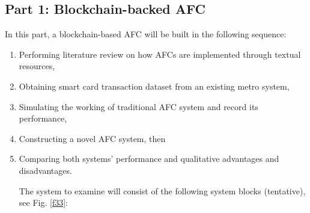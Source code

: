\documentclass[a4paper,12pt,oneside, utf8x]{report}
\begin{document}
\subsection{Part 1: Blockchain-backed AFC}
In this part, a blockchain-based AFC will be built in the following sequence:
\begin{enumerate}
\item Performing literature review on how AFCs are implemented through textual resources,
\item Obtaining smart card transaction dataset from an existing metro system,
\item Simulating the working of traditional AFC system and record its performance,
\item Constructing a novel AFC system, then
\item Comparing both systems’ performance and qualitative advantages and disadvantages.

The system to examine will consist of the following system blocks (tentative), see Fig. \ref{f33}:


\end{enumerate}
\end{document}
